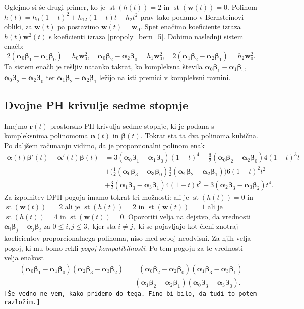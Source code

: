 \documentclass[12pt,a4paper,twoside]{article}
\theoremstyle{definition} %
\theoremstyle{plain} %
\numberwithin{equation}{section}  %
\newcommand{\rV}{\mathbf{r}}
\newcommand{\wV}{\mathbf{w}}
\newcommand{\balpha}{\boldsymbol \alpha}
\newcommand{\bbeta}{\boldsymbol \beta}
\DeclareMathOperator{\st}{st}
\begin{document}
Oglejmo si še drugi primer, ko je $\st(h(t))=2$ in $\st(\wV(t))=0.$ Polinom $h(t)=h_0(1-t)^2+h_12(1-t)t+h_2t^2$ prav tako podamo v Bernsteinovi obliki, za $\wV(t)$ pa postavimo $\wV(t)=\wV_0.$ Spet enačimo koeficiente izraza $h(t)\wV^2(t)$ s koeficienti izraza \eqref{propoly_bern_5}. Dobimo naslednji sistem enačb:
\begin{equation}
	2(\balpha_0\bbeta_1-\balpha_1\bbeta_0)=h_0\wV_0^2,\quad \balpha_0\bbeta_2-\balpha_2\bbeta_0=h_1\wV_0^2,\quad 2(\balpha_1\bbeta_2-\balpha_2\bbeta_1)=h_2\wV_0^2.\label{st5h2w0}
\end{equation}
Ta sistem enačb je rešljiv natanko takrat, ko kompleksna števila $\balpha_0\bbeta_1-\balpha_1\bbeta_0,$ $\balpha_0\bbeta_2-\balpha_2\bbeta_0$ ter $\balpha_1\bbeta_2-\balpha_2\bbeta_1$ ležijo na isti premici v kompleksni ravnini.

\subsection{Dvojne PH krivulje sedme stopnje}

Imejmo $\rV(t)$ prostorsko PH krivulja sedme stopnje, ki je podana s kompleksnima polinomoma $\balpha(t)$ in $\bbeta(t).$ Tokrat sta ta dva polinoma kubična. Po daljšem računanju vidimo, da je proporcionalni polinom enak
\begin{align}
	\balpha(t)\bbeta'(t)-\balpha'(t)\bbeta(t)&=3(\balpha_0\bbeta_1-\balpha_1\bbeta_0)(1-t)^4+\frac{3}{2}(\balpha_0\bbeta_2-\balpha_2\bbeta_0)4(1-t)^3t\nonumber\\
	&+\big(\frac{1}{2}(\balpha_0\bbeta_3-\balpha_3\bbeta_0)\frac{3}{2}(\balpha_1\bbeta_2-\balpha_2\bbeta_1)\big)6(1-t)^2t^2\nonumber\\
	&+\frac{3}{2}(\balpha_1\bbeta_3-\balpha_3\bbeta_1)4(1-t)t^3+3(\balpha_2\bbeta_3-\balpha_3\bbeta_2)t^4. \label{propoly_bern_7}
\end{align}
Za izpolnitev DPH pogoja imamo tokrat tri možnosti: ali je $\st(h(t))=0$ in \\$\st(\wV(t))~=~2$ ali je $\st(h(t))=2$ in $\st(\wV(t))~=~1$ ali je $\st(h(t))=4$ in $\st(\wV(t))=0.$ Opozoriti velja na dejstvo, da vrednosti $\balpha_i\bbeta_j-\balpha_j\bbeta_i$ za $0\leq i,j\leq 3,$ kjer sta $i\neq j,$ ki se pojavljajo kot členi znotraj koeficientov proporcionalnega polinoma, niso med seboj neodvisni. Za njih velja pogoj, ki mu bomo rekli \emph{pogoj kompatibilnosti}. Po tem pogoju za te vrednosti velja enakost
\begin{align}
	(\balpha_0\bbeta_1-\balpha_1\bbeta_0)(\balpha_2\bbeta_3-\balpha_3\bbeta_2)&=(\balpha_0\bbeta_2-\balpha_2\bbeta_0)(\balpha_1\bbeta_3-\balpha_3\bbeta_1)\nonumber\\
	&-(\balpha_1\bbeta_2-\balpha_2\bbeta_1)(\balpha_0\bbeta_3-\balpha_3\bbeta_0).\label{pogoj_kompatibilnosti}
\end{align}
\texttt{[Še vedno ne vem, kako pridemo do tega. Fino bi bilo, da tudi to potem razložim.]}
\end{document}
